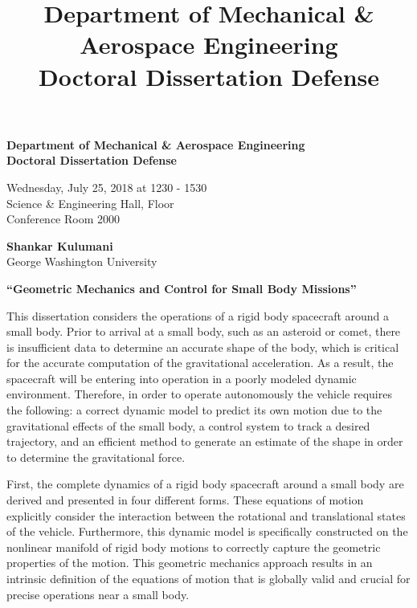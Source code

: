 \documentclass{article}
\title{Department of Mechanical \& Aerospace Engineering\\
Doctoral Dissertation Defense}
\date{}
\begin{document}
\begin{center}
    \textbf{\large
    Department of Mechanical \& Aerospace Engineering\\
    Doctoral Dissertation Defense
}
\end{center}

\begin{center}
    Wednesday, July 25, 2018 at 1230 - 1530\\
    Science \& Engineering Hall,  Floor\\
    Conference Room 2000
\end{center}

\begin{center}
    \textbf{Shankar Kulumani}\\
    George Washington University
\end{center}

\begin{center}
    \textbf{``Geometric Mechanics and Control for Small Body Missions''}
\end{center}

This dissertation considers the operations of a rigid body spacecraft around a small body.
Prior to arrival at a small body, such as an asteroid or comet, there is insufficient data to determine an accurate shape of the body, which is critical for the accurate computation of the gravitational acceleration. 
As a result, the spacecraft will be entering into operation in a poorly modeled dynamic environment.
Therefore, in order to operate autonomously the vehicle requires the following: a correct dynamic model to predict its own motion due to the gravitational effects of the small body, a control system to track a desired trajectory, and an efficient method to generate an estimate of the shape in order to determine the gravitational force.

First, the complete dynamics of a rigid body spacecraft around a small body are derived and presented in four different forms.
These equations of motion explicitly consider the interaction between the rotational and translational states of the vehicle.
Furthermore, this dynamic model is specifically constructed on the nonlinear manifold of rigid body motions to correctly capture the geometric properties of the motion. 
This geometric mechanics approach results in an intrinsic definition of the equations of motion that is globally valid and crucial for precise operations near a small body.
\end{document}
